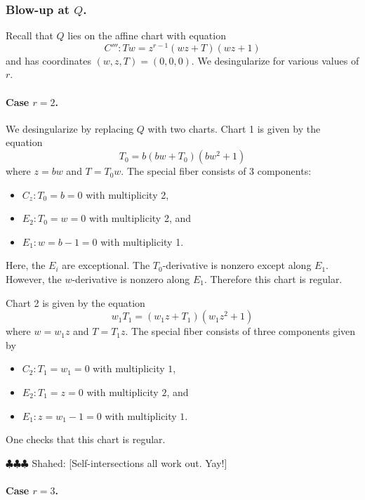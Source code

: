 \documentclass{article}
\newcommand{\shahed}[1]{{\color{Purple} \sf $\clubsuit\clubsuit\clubsuit$ Shahed: [#1]}}
\theoremstyle{plain}
\theoremstyle{definition}
\theoremstyle{remark}
\begin{document}
\subsubsection{Blow-up at $Q$.}
\label{sec:blow-up-Q}

Recall that $Q$ lies on the affine chart with equation
\begin{equation}
  C''':Tw = z^{r-1}(wz + T)(wz + 1)\label{eq:C'''}
\end{equation}
and has coordinates $(w,z,T) = (0,0,0)$. We desingularize for various values of $r$.

\paragraph{Case $r = 2$.}
\label{sec:r=2}

We desingularize by replacing $Q$ with two charts. Chart 1 is given by the equation
\[
T_0 = b(bw + T_0)(bw^2 + 1)
\]
where $z = bw$ and $T = T_0w$. The special fiber consists of 3 components:
\begin{itemize}
    \item $C_z: T_0 = b = 0$ with multiplicity 2,
    \item $E_2: T_0 = w = 0$ with multiplicity 2, and
    \item $E_1: w = b-1 = 0$ with multiplicity 1.
\end{itemize}
Here, the $E_i$ are exceptional. The $T_0$-derivative is nonzero except along $E_1$. However, the $w$-derivative is nonzero along $E_1$. Therefore this chart is regular.

Chart 2 is given by the equation
\[
w_1 T_1 = (w_1z + T_1)(w_1 z^2 + 1)
\]
where $w = w_1 z$ and $T = T_1 z$. The special fiber consists of three components given by
\begin{itemize}
    \item $C_2: T_1 = w_1 = 0$ with multiplicity $1$,
    \item $E_2: T_1 = z = 0$ with multiplicity $2$, and
    \item $E_1: z = w_1-1 = 0$ with multiplicity $1$.
\end{itemize}
One checks that this chart is regular.

\shahed{Self-intersections all work out. Yay!}



\paragraph{Case $r=3$.}
\label{sec:r=3}
\end{document}
